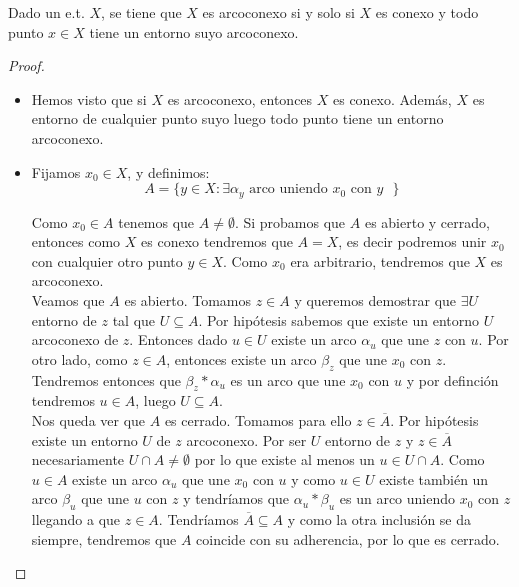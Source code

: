\begin{teo}\label{teo:arcoconexo_entorno}
    Dado un e.t. $X$, se tiene que $X$ es arcoconexo si y solo si $X$ es conexo y todo punto $x\in X$ tiene un entorno suyo arcoconexo.

    \begin{proof}\
        \begin{itemize}
            \item[$\Longrightarrow$)] Hemos visto que si $X$ es arcoconexo, entonces $X$ es conexo. Además, $X$ es entorno de cualquier punto suyo luego todo punto tiene un entorno arcoconexo.
            \item[$\Longleftarrow$)] Fijamos $x_0\in X$, y definimos:
            $$A = \{y\in X : \exists \alpha_y \text{ arco uniendo $x_0$ con $y$ }\}$$
            
            Como $x_0\in A$ tenemos que $A\neq \emptyset$. Si probamos que $A$ es abierto y cerrado, entonces como $X$ es conexo tendremos que $A=X$, es decir podremos unir $x_0$ con cualquier otro punto $y\in X$. Como $x_0$ era arbitrario, tendremos que $X$ es arcoconexo.\\

            Veamos que $A$ es abierto. Tomamos $z\in A$ y queremos demostrar que $\exists U$ entorno de $z$ tal que $U\subseteq A$. Por hipótesis sabemos que existe un entorno $U$ arcoconexo de $z$. Entonces dado $u\in U$ existe un arco $\alpha_u$ que une $z$ con $u$. Por otro lado, como $z\in A$, entonces existe un arco $\beta_z$ que une $x_0$ con $z$. Tendremos entonces que $\beta_z\ast\alpha_u$ es un arco que une $x_0$ con $u$ y por definción tendremos $u\in A$, luego $U\subseteq A$.\\

            Nos queda ver que $A$ es cerrado. Tomamos para ello $z\in \overline{A}$. Por hipótesis existe un entorno $U$ de $z$ arcoconexo. Por ser $U$ entorno de $z$ y $z\in \overline{A}$ necesariamente $U\cap A \neq \emptyset$ por lo que existe al menos un $u\in U \cap A$. Como $u\in A$ existe un arco $\alpha_u$ que une $x_0$ con $u$ y como $u\in U$ existe también un arco $\beta_u$ que une $u$ con $z$ y tendríamos que $\alpha_u\ast\beta_u$ es un arco uniendo $x_0$ con $z$ llegando a que $z\in A$. Tendríamos $\overline{A}\subseteq A$ y como la otra inclusión se da siempre, tendremos que $A$ coincide con su adherencia, por lo que es cerrado.
        \end{itemize}
    \end{proof}
\end{teo}

